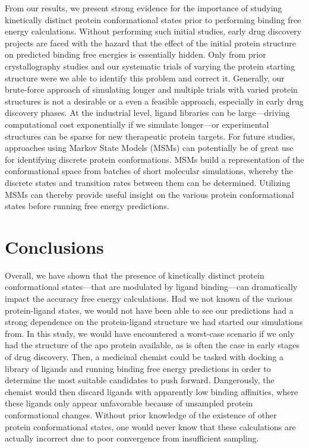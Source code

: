 \documentclass[journal=jctcce,manuscript=article]{achemso}
\begin{document}
From our results, we present strong evidence for the importance of studying kinetically distinct protein conformational states prior to performing binding free energy calculations.
Without performing such initial studies, early drug discovery projects are faced with the hazard that the effect of the initial protein structure on predicted binding free energies is essentially hidden.
Only from prior crystallography studies\cite{Merski2015} and our systematic trials of varying the protein starting structure were we able to identify this problem and correct it.
Generally, our brute-force approach of simulating longer and multiple trials with varied protein structures is not a desirable or a even a feasible approach, especially in early drug discovery phases.
At the industrial level, ligand libraries can be large---driving computational cost exponentially if we simulate longer---or experimental structures can be sparse for new therapeutic protein targets.
For future studies, approaches using Markov State Models (MSMs)\cite{MSM} can potentially be of great use for identifying discrete protein conformations.
MSMs build a representation of the conformational space from batches of short molecular simulations, whereby the discrete states and transition rates between them can be determined.
Utilizing MSMs can thereby provide useful insight on the various protein conformational states before running free energy predictions.

\section{Conclusions}
Overall, we have shown that the presence of kinetically distinct protein conformational states---that are modulated by ligand binding---can dramatically impact the accuracy free energy calculations.
Had we not known of the various protein-ligand states, we would not have been able to see our predictions had a strong dependence on the protein-ligand structure we had started our simulations from.
In this study, we would have encountered a worst-case scenario if we only had the structure of the apo protein available, as is often the case in early stages of drug discovery.
Then, a medicinal chemist could be tasked with docking a library of ligands and running binding free energy predictions in order to determine the most suitable candidates to push forward.
Dangerously, the chemist would then discard ligands with apparently low binding affinities, where these ligands only appear unfavorable because of unsampled protein conformational changes.
Without prior knowledge of the existence of other protein conformational states, one would never know that these calculations are actually incorrect due to poor convergence from insufficient sampling.
\end{document}
